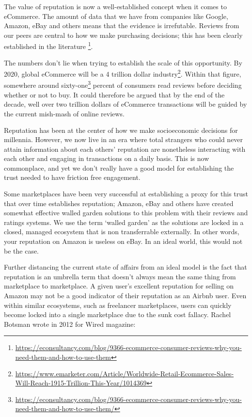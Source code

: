 \documentclass[a4paper]{article}
\begin{document}
The value of reputation is now a well-established concept when it
comes to eCommerce. The amount of data that we have from companies
like Google, Amazon, eBay and others means that the evidence is
irrefutable. Reviews from our peers are central to how we make
purchasing decisions; this has been clearly established in the
literature \footnote{\url{https://econsultancy.com/blog/9366-ecommerce-consumer-reviews-why-you-need-them-and-how-to-use-them}}.
 
The numbers don't lie when trying to establish the scale of this
opportunity. By 2020, global eCommerce will be a 4 trillion dollar
industry\footnote{\url{https://www.emarketer.com/Article/Worldwide-Retail-Ecommerce-Sales-Will-Reach-1915-Trillion-This-Year/1014369}}. Within
that figure, somewhere around
sixty-one\footnote{\url{https://econsultancy.com/blog/9366-ecommerce-consumer-reviews-why-you-need-them-and-how-to-use-them/}}
percent of consumers read reviews before deciding whether or not to
buy. It could therefore be argued that by the end of the decade, well
over two trillion dollars of eCommerce transactions will be guided by
the current mish-mash of online reviews.
 
Reputation has been at the center of how we make socioeconomic
decisions for millennia. However, we now live in an era where total
strangers who could never attain information about each others'
reputation are nonetheless interacting with each other and engaging in
transactions on a daily basis. This is now commonplace, and yet we
don't really have a good model for establishing the trust needed to
have friction free engagement.
 
Some marketplaces have been very successful at establishing a proxy
for this trust that over time establishes reputation; Amazon, eBay and
others have created somewhat effective walled garden solutions to this
problem with their reviews and ratings systems. We use the term
`walled garden' as the solutions are locked in a closed, managed
ecosystem that is non transferrable externally. In other words, your
reputation on Amazon is useless on eBay. In an ideal world, this would
not be the case.
 
Further distancing the current state of affairs from an ideal model is
the fact that reputation is an umbrella term that doesn't always mean
the same thing from marketplace to marketplace. A given user's
excellent reputation for selling on Amazon may not be a good indicator
of their reputation as an Airbnb user. Even within similar ecosystems,
such as freelancer marketplaces, users can quickly become locked into
a single marketplace due to the sunk cost fallacy. Rachel Botsman
wrote in 2012 for Wired magazine:
\end{document}
